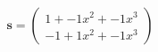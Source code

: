 \documentclass[preview]{standalone}
\begin{document}
\begin{align*}
\mathbf{s} = \begin{pmatrix}1 + -1x^{2} + -1x^{3} \\ -1 + 1x^{2} + -1x^{3}\end{pmatrix}
\end{align*}
\end{document}
